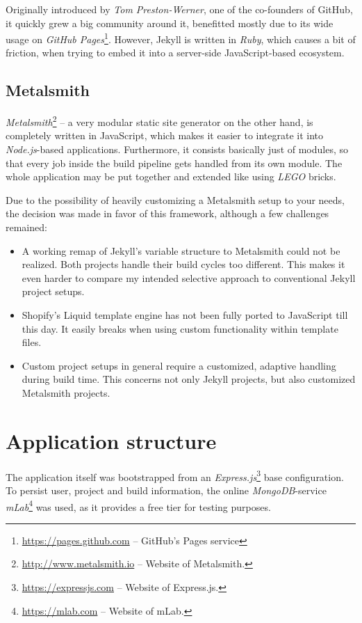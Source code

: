\documentclass[a4paper,english,11pt]{report}
\begin{document}
Originally introduced by \emph{Tom Preston-Werner}, one of the co-founders of GitHub, it quickly grew a big community around it, benefitted mostly due to its wide usage on \emph{GitHub Pages}\footnote{\url{https://pages.github.com} -- GitHub's Pages service}. However, Jekyll is written in \emph{Ruby}, which causes a bit of friction, when trying to embed it into a server-side JavaScript-based ecosystem.

\subsection{Metalsmith}
\emph{Metalsmith}\footnote{\url{http://www.metalsmith.io} -- Website of Metalsmith.} -- a very modular static site generator on the other hand, is completely written in JavaScript, which makes it easier to integrate it into \emph{Node.js}-based applications. Furthermore, it consists basically just of modules, so that every job inside the build pipeline gets handled from its own module. The whole application may be put together and extended like using \emph{LEGO} bricks.

Due to the possibility of heavily customizing a Metalsmith setup to your needs, the decision was made in favor of this framework, although a few challenges remained:

\begin{itemize}
  \item A working remap of Jekyll's variable structure to Metalsmith could not be realized. Both projects handle their build cycles too different. This makes it even harder to compare my intended selective approach to conventional Jekyll project setups.
  \item Shopify's Liquid template engine has not been fully ported to JavaScript till this day. It easily breaks when using custom functionality within template files.
  \item Custom project setups in general require a customized, adaptive handling during build time. This concerns not only Jekyll projects, but also customized Metalsmith projects.
\end{itemize}

\section{Application structure}
The application itself was bootstrapped from an \emph{Express.js}\footnote{\url{https://expressjs.com} -- Website of Express.js.} base configuration. To persist user, project and build information, the online \emph{MongoDB}-service \emph{mLab}\footnote{\url{https://mlab.com} -- Website of mLab.} was used, as it provides a free tier for testing purposes.
\end{document}
